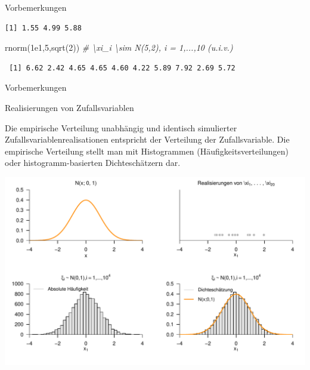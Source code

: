 \documentclass[
  8pt,
  ignorenonframetext,
]{beamer}
\newenvironment{Shaded}{\begin{snugshade}}{\end{snugshade}}
\newcommand{\CommentTok}[1]{\textcolor[rgb]{0.56,0.35,0.01}{\textit{#1}}}
\newcommand{\DecValTok}[1]{\textcolor[rgb]{0.00,0.00,0.81}{#1}}
\newcommand{\FloatTok}[1]{\textcolor[rgb]{0.00,0.00,0.81}{#1}}
\newcommand{\FunctionTok}[1]{\textcolor[rgb]{0.00,0.00,0.00}{#1}}
\newcommand{\NormalTok}[1]{#1}
\begin{document}
\begin{frame}[fragile]{Vorbemerkungen}
\begin{verbatim}
[1] 1.55 4.99 5.88
\end{verbatim}

\begin{Shaded}
\begin{Highlighting}[]
\FunctionTok{rnorm}\NormalTok{(}\FloatTok{1e1}\NormalTok{,}\DecValTok{5}\NormalTok{,}\FunctionTok{sqrt}\NormalTok{(}\DecValTok{2}\NormalTok{))            }\CommentTok{\# \textbackslash{}xi\_i \textbackslash{}sim N(5,2), i = 1,...,10 (u.i.v.)}
\end{Highlighting}
\end{Shaded}

\begin{verbatim}
 [1] 6.62 2.42 4.65 4.65 4.60 4.22 5.89 7.92 2.69 5.72
\end{verbatim}
\end{frame}

\begin{frame}{Vorbemerkungen}
\protect\hypertarget{vorbemerkungen-1}{}
\vspace{1mm}

Realisierungen von Zufallsvariablen

\justifying
\footnotesize
{}

Die empirische Verteilung unabhängig und identisch simulierter
Zufallsvariablenrealisationen entspricht der Verteilung der
Zufallsvariable. Die empirische Verteilung stellt man mit Histogrammen
(Häufigkeitsverteilungen) oder histogramm-basierten Dichteschätzern dar.

\vspace{5mm}
\center

\begin{center}\includegraphics[width=0.9\linewidth]{8_Abbildungen/wtfi_8_realisierungen} \end{center}
\end{frame}
\end{document}
